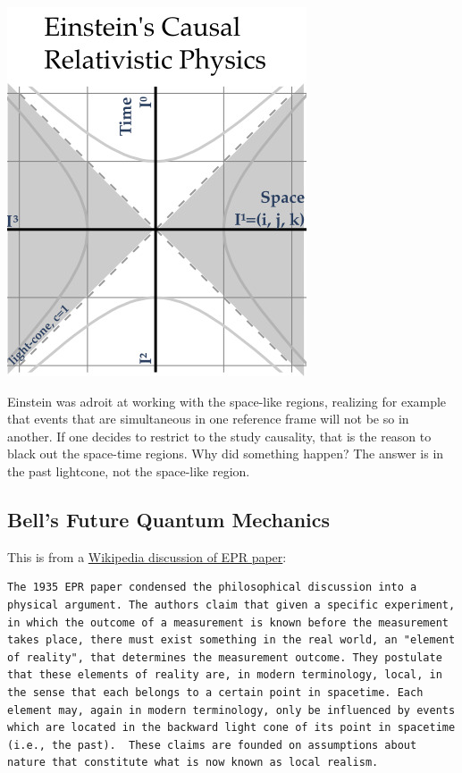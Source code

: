 \includegraphics{../images/QM/BellsFuture/Bells_future_QM_Einstein.jpg}

Einstein was adroit at working with the space-like regions, realizing
for example that events that are simultaneous in one reference frame
will not be so in another. If one decides to restrict to the study
causality, that is the reason to black out the space-time regions. Why
did something happen? The answer is in the past lightcone, not the
space-like region.

\hypertarget{bells-future-quantum-mechanics}{%
\subsection{Bell's Future Quantum
Mechanics}\label{bells-future-quantum-mechanics}}

This is from a
\href{https://en.wikipedia.org/wiki/EPR_paradox\#The_paradox}{Wikipedia
discussion of EPR paper}:

\begin{verbatim}
The 1935 EPR paper condensed the philosophical discussion into a physical argument. The authors claim that given a specific experiment, in which the outcome of a measurement is known before the measurement takes place, there must exist something in the real world, an "element of reality", that determines the measurement outcome. They postulate that these elements of reality are, in modern terminology, local, in the sense that each belongs to a certain point in spacetime. Each element may, again in modern terminology, only be influenced by events which are located in the backward light cone of its point in spacetime (i.e., the past).  These claims are founded on assumptions about nature that constitute what is now known as local realism.
\end{verbatim}

